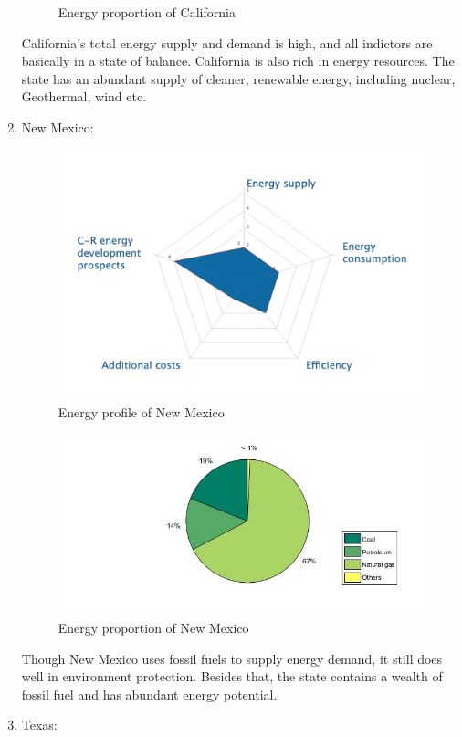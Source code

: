 \documentclass{mcmthesis}
\begin{document}
\begin{enumerate}
\begin{figure}[ht]
    \caption{Energy proportion of California}
    \end{figure}
     California’s total energy supply and demand is high, and all indictors are basically in a state of balance. California is also rich in energy resources. The state has an abundant supply of cleaner, renewable energy, including nuclear, Geothermal, wind etc.
    \item New Mexico:
    \begin{figure}[ht]
    \centering
    \includegraphics[scale=0.6]{NM.png}
    \caption{Energy profile of New Mexico}
    \end{figure}
    \begin{figure}[ht]
    \centering
    \includegraphics[scale=0.6]{NM1.jpg}
    \caption{Energy proportion of New Mexico}
    \end{figure}
     Though New Mexico uses fossil fuels to supply energy demand, it still does well in environment protection. Besides that, the state contains a wealth of fossil fuel and has abundant energy potential.
    \item Texas:


\end{enumerate}
\end{document}
